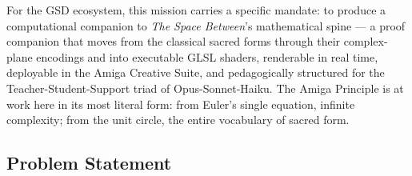 \documentclass[11pt,letterpaper]{article}
\begin{document}
For the GSD ecosystem, this mission carries a specific mandate: to produce a computational companion to \textit{The Space Between}'s mathematical spine --- a proof companion that moves from the classical sacred forms through their complex-plane encodings and into executable GLSL shaders, renderable in real time, deployable in the Amiga Creative Suite, and pedagogically structured for the Teacher-Student-Support triad of Opus-Sonnet-Haiku. The Amiga Principle is at work here in its most literal form: from Euler's single equation, infinite complexity; from the unit circle, the entire vocabulary of sacred form.

\subsection{Problem Statement}
\end{document}

